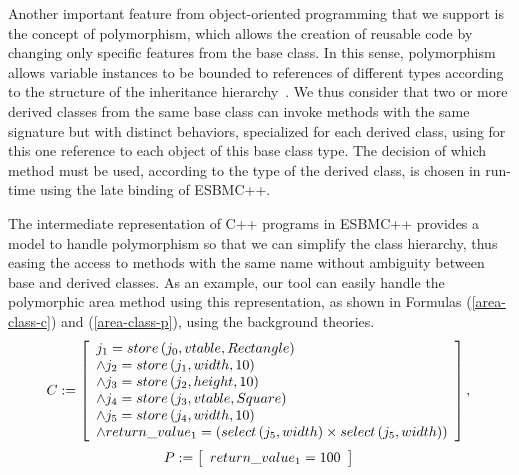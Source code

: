 \documentclass[a4paper]{llncs}
\begin{document}
Another important feature from object-oriented programming that we
support is the concept of polymorphism, which allows the creation of
reusable code by changing only specific features from the base class.
In this sense, polymorphism allows variable instances to be
bounded to references of different types according to the structure of the
inheritance hierarchy~\cite{Alexander02}.
We thus consider that two or more derived classes
from the same base class can invoke methods with the same signature but with distinct behaviors,
specialized for each derived class, using for this one reference to each object of
this base class type. The decision of which method must be used, according to the type
of the derived class, is chosen in run-time using the late binding of ESBMC++.


The intermediate representation of C++ programs in ESBMC++ provides a model
to handle polymorphism so that we can simplify the class hierarchy,
thus easing the access to methods with the same name without ambiguity between
base and derived classes. As an example, our tool can easily handle the polymorphic
area method using this representation, as shown in Formulas (\ref{area-class-c}) and
(\ref{area-class-p}), using the background theories.
%
\begin{equation}
\label{area-class-c}
C := \left [ \begin{array}{ll}
        j_{1} = store\left(j_{0}, vtable, Rectangle\right) \\
        \wedge j_{2} = store\left(j_{1}, width, 10\right) \\
        \wedge j_{3} = store\left(j_{2}, height, 10\right) \\
        \wedge j_{4} = store\left(j_{3}, vtable, Square\right) \\
        \wedge j_{5} = store\left(j_{4}, width, 10\right) \\
        \wedge return\_value_{1} = \left(select\left(j_{5}, width\right) \times select\left(j_{5}, width\right)\right) \\
              \end{array} \right ],  \\
\end{equation}
%
\begin{equation}
\label{area-class-p}
P := \left [ \begin{array}{ll}
              return\_value_{1} = 100 \\
              \end{array} \right ]  \\
\end{equation}
%
\end{document}
